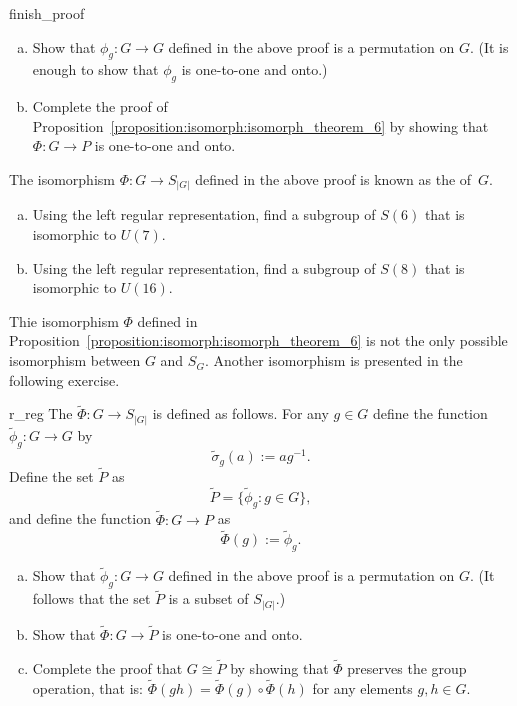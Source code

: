 \begin{exercise}{finish_proof}
\begin{enumerate}[(a)]
\item
Show that $\phi_g : G \rightarrow G$ defined in the above proof is a permutation on $G$. (It is enough to show that $\phi_g$ is one-to-one and onto.) 
\item
Complete the proof of Proposition~\ref{proposition:isomorph:isomorph_theorem_6} by showing that $\Phi:G \rightarrow P$ is one-to-one and onto. 
\end{enumerate}
\end{exercise}

The isomorphism $\Phi: G \rightarrow S_{|G|}$ defined in the above proof is known as the  of~$G$. 

\begin{exercise}{}
\begin{enumerate}[(a)]
\item
Using the left regular representation, find a subgroup of $S(6)$ that is isomorphic to $U(7)$.
\item
Using the left regular representation, find a subgroup of $S(8)$ that is isomorphic to $U(16)$.
\end{enumerate}
\end{exercise}

Thie isomorphism $\Phi$ defined in Proposition~\ref{proposition:isomorph:isomorph_theorem_6}  is not the only possible isomorphism between $G$ and $S_{G}$. Another isomorphism is presented in the following exercise.

\begin{exercise}{r_reg}
The   $\tilde{\Phi}: G \rightarrow S_{|G|}$  is defined as follows. For any $g \in G$ define the  function $\tilde{\phi}_g : G \rightarrow G$ by 
\[
\tilde{\sigma}_g(a) := ag^{-1}.
\]
Define the set $\tilde{P}$ as
\[
\tilde{P} = \{ \tilde{\phi}_g : g \in G \},
\]
and define the function $\tilde{\Phi}: G \rightarrow P$ as
\[ \tilde{\Phi}(g) := \tilde{\phi}_g. \]
\begin{enumerate}[(a)]
\item
Show that $\tilde{\phi}_g : G \rightarrow G$ defined in the above proof is a permutation on $G$. (It follows that the set $\tilde{P}$ is a subset of $S_{|G|}$.)
\item
Show that $\tilde{\Phi}:G \rightarrow \tilde{P}$ is one-to-one and onto. 
 \item
Complete the proof that $G \cong \tilde{P}$ by showing that $\tilde{\Phi}$ preserves the group operation, that is: $\tilde{\Phi}(gh) = \tilde{\Phi}(g) \circ \tilde{\Phi}(h)$ for any elements $g, h \in G$.
\end{enumerate}
\end{exercise}

